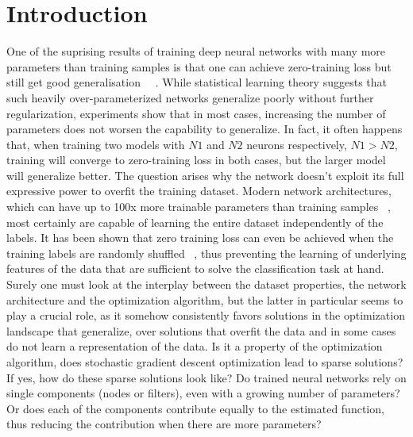\setlength\parindent{0pt}

\section{Introduction}
One of the suprising results of training deep neural networks with many more parameters than training samples is that one can achieve zero-training loss but still get good generalisation ~~\autocite{neyshabur2018towards}. While statistical learning theory suggests that such heavily over-parameterized networks generalize poorly without further regularization, experiments show that in most cases, increasing the number of parameters does not worsen the capability to generalize. In fact, it often happens that, when training two models with $N1$ and $N2$ neurons respectively, $N1 > N2$, training will converge to zero-training loss in both cases, but the larger model will generalize better. The question arises why the network doesn't exploit its full expressive power to overfit the training dataset. Modern network architectures, which can have up to 100x more trainable parameters than training samples ~\autocite{zagoruyko2016wide}, most certainly are capable of learning the entire dataset independently of the labels. It has been shown that zero training loss can even be achieved when the training labels are randomly shuffled ~\autocite{zhang2016understanding}, thus preventing the learning of underlying features of the data that are sufficient to solve the classification task at hand. \\

Surely one must look at the interplay between the dataset properties, the network architecture and the optimization algorithm, but the latter in particular seems to play a crucial role, as it somehow consistently favors solutions in the optimization landscape that generalize, over solutions that overfit the data and in some cases do not learn a representation of the data. Is it a property of the optimization algorithm, does stochastic gradient descent optimization lead to sparse solutions? If yes, how do these sparse solutions look like? Do trained neural networks rely on single components (nodes or filters), even with a growing number of parameters? Or does each of the components contribute equally to the estimated function, thus reducing the contribution when there are more parameters? \\

